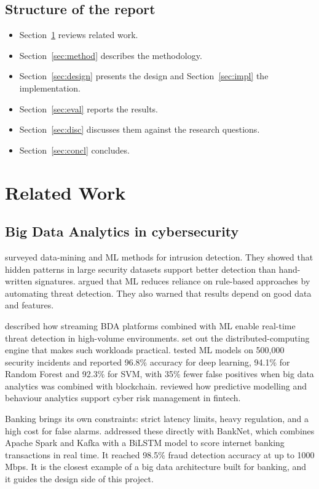 \documentclass[12pt,a4paper]{article}
\begin{document}
\subsection{Structure of the report}
\begin{itemize}[nosep]
\item Section~\ref{sec:lit} reviews related work.
\item Section~\ref{sec:method} describes the methodology.
\item Section~\ref{sec:design} presents the design and Section~\ref{sec:impl} the implementation.
\item Section~\ref{sec:eval} reports the results.
\item Section~\ref{sec:disc} discusses them against the research questions.
\item Section~\ref{sec:concl} concludes.
\end{itemize}

\section{Related Work}\label{sec:lit}

\subsection{Big Data Analytics in cybersecurity}
\citet{buczak2016survey} surveyed data-mining and ML methods for intrusion detection. They showed that hidden patterns in large security datasets support better detection than hand-written signatures. \citet{martinez2019machine} argued that ML reduces reliance on rule-based approaches by automating threat detection. They also warned that results depend on good data and features.

\citet{ofoegbu2024realtime} described how streaming BDA platforms combined with ML enable real-time threat detection in high-volume environments. \citet{zaharia2016spark} set out the distributed-computing engine that makes such workloads practical. \citet{kumar2025bigdata} tested ML models on 500{,}000 security incidents and reported 96.8\% accuracy for deep learning, 94.1\% for Random Forest and 92.3\% for SVM, with 35\% fewer false positives when big data analytics was combined with blockchain. \citet{kokogho2025fintech} reviewed how predictive modelling and behaviour analytics support cyber risk management in fintech.

Banking brings its own constraints: strict latency limits, heavy regulation, and a high cost for false alarms. \citet{sathupadi2025banknet} addressed these directly with BankNet, which combines Apache Spark and Kafka with a BiLSTM model to score internet banking transactions in real time. It reached 98.5\% fraud detection accuracy at up to 1000 Mbps. It is the closest example of a big data architecture built for banking, and it guides the design side of this project.
\end{document}
